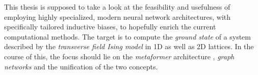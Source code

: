 This thesis is supposed to take a look at the feasibility and usefulness of employing highly specialized, modern neural network architectures, with specifically tailored inductive biases, to hopefully enrich the current computational methods. 
The target is to compute the \emph{ground state} of a system described by the \emph{transverse field Ising model} \cite*[]{isingBook} in 1D as well as 2D lattices.
In the course of this, the focus should lie on the \emph{metaformer} architecture \cite*[]{metaformerPaper}, \emph{graph networks} \cite*[]{relationalInductiveBiasesAndGraphNetworks} and the unification of the two concepts.
